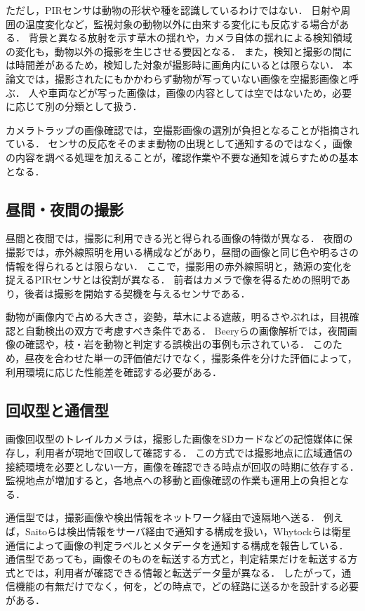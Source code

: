 ただし，PIRセンサは動物の形状や種を認識しているわけではない．
日射や周囲の温度変化など，監視対象の動物以外に由来する変化にも反応する場合がある\cite{PanasonicPIR}．
背景と異なる放射を示す草木の揺れや，カメラ自体の揺れによる検知領域の変化も，動物以外の撮影を生じさせる要因となる\cite{Welbourne2016}．
また，検知と撮影の間には時間差があるため，検知した対象が撮影時に画角内にいるとは限らない．
本論文では，撮影されたにもかかわらず動物が写っていない画像を空撮影画像と呼ぶ．
人や車両などが写った画像は，画像の内容としては空ではないため，必要に応じて別の分類として扱う．

カメラトラップの画像確認では，空撮影画像の選別が負担となることが指摘されている\cite{Beery2019}．
センサの反応をそのまま動物の出現として通知するのではなく，画像の内容を調べる処理を加えることが，確認作業や不要な通知を減らすための基本となる．

\subsection{昼間・夜間の撮影}
昼間と夜間では，撮影に利用できる光と得られる画像の特徴が異なる．
夜間の撮影では，赤外線照明を用いる構成などがあり，昼間の画像と同じ色や明るさの情報を得られるとは限らない．
ここで，撮影用の赤外線照明と，熱源の変化を捉えるPIRセンサとは役割が異なる．
前者はカメラで像を得るための照明であり，後者は撮影を開始する契機を与えるセンサである．

動物が画像内で占める大きさ，姿勢，草木による遮蔽，明るさやぶれは，目視確認と自動検出の双方で考慮すべき条件である．
Beeryらの画像解析では，夜間画像の確認や，枝・岩を動物と判定する誤検出の事例も示されている\cite{Beery2019}．
このため，昼夜を合わせた単一の評価値だけでなく，撮影条件を分けた評価によって，利用環境に応じた性能差を確認する必要がある．

\subsection{回収型と通信型}
画像回収型のトレイルカメラは，撮影した画像をSDカードなどの記憶媒体に保存し，利用者が現地で回収して確認する．
この方式では撮影地点に広域通信の接続環境を必要としない一方，画像を確認できる時点が回収の時期に依存する．
監視地点が増加すると，各地点への移動と画像確認の作業も運用上の負担となる．

通信型では，撮影画像や検出情報をネットワーク経由で遠隔地へ送る．
例えば，Saitoらは検出情報をサーバ経由で通知する構成を扱い\cite{IEICE2020}，Whytockらは衛星通信によって画像の判定ラベルとメタデータを通知する構成を報告している\cite{Whytock2023}．
通信型であっても，画像そのものを転送する方式と，判定結果だけを転送する方式とでは，利用者が確認できる情報と転送データ量が異なる．
したがって，通信機能の有無だけでなく，何を，どの時点で，どの経路に送るかを設計する必要がある．

